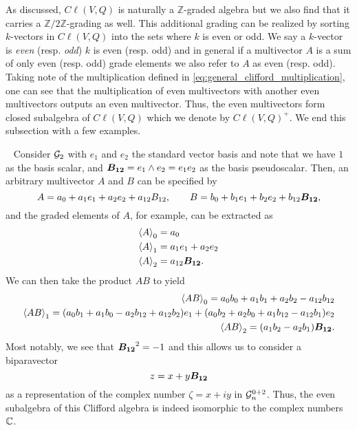 As discussed, $C\ell(V,Q)$ is naturally a $\mathbb{Z}$-graded algebra but we also find that it carries a $\mathbb{Z}/2\mathbb{Z}$-grading as well. This additional grading can be realized by sorting $k$-vectors in $C\ell(V,Q)$ into the sets where $k$ is even or odd.  We say a $k$-vector is \emph{even} (resp. \emph{odd}) $k$ is even (resp. odd) and in general if a multivector $A$ is a sum of only even (resp. odd) grade elements we also refer to $A$ as even (resp. odd).  Taking note of the multiplication defined in \ref{eq:general_clifford_multiplication}, one can see that the multiplication of even multivectors with another even multivectors outputs an even multivector.  Thus, the even multivectors form closed subalgebra of $C\ell(V,Q)$ which we denote by $C\ell(V,Q)^+$. We end this subsection with a few examples.

\begin{example}
\label{ex:complex_representation}~
Consider $\G_2$ with $e_1$ and $e_2$ the standard vector basis and note that we have $1$ as the basis scalar, and $\blade{B_{12}} = e_1\wedge e_2 = e_1e_2$ as the basis pseudoscalar.  Then, an arbitrary multivector $A$ and $B$ can be specified by
\[
A = a_0 + a_1 e_1 + a_2 e_2 + a_{12} B_{12}, \qquad B = b_0 +b_1 e_1 + b_2 e_2 + b_{12}\blade{B_{12}},
\]
and the graded elements of $A$, for example, can be extracted as
\begin{subequations}
\begin{align}
\proj{0}{A}&=a_0\\
\proj{1}{A}&=a_1 e_1 + a_2 e_2\\
\proj{2}{A}&=a_{12} \blade{B_{12}}.
\end{align}
\end{subequations}
We can then take the product $AB$ to yield
\begin{subequations}
\begin{align}
\proj{0}{AB} = a_0b_0 + a_1 b_1 + a_2 b_2 - a_{12}b_{12}\\
\proj{1}{AB} = (a_0 b_1 + a_1 b_0 - a_2 b_{12} + a_{12} b_2) e_1 + (a_0 b_2 + a_2 b_0 + a_1b_{12} - a_{12} b_1) e_2\\
\proj{2}{AB} = (a_1b_2 - a_2 b_1)\blade{B_{12}}.
\end{align}
\end{subequations}
Most notably, we see that $\blade{B_{12}}^2=-1$ and this allows us to consider a biparavector
\begin{equation}
z = x + y \blade{B_{12}}
\end{equation}
as a representation of the complex number $\zeta = x+ iy$ in $\G_n^{0+2}$.  Thus, the even subalgebra of this Clifford algebra is indeed isomorphic to the complex numbers $\C$. 
\end{example}

